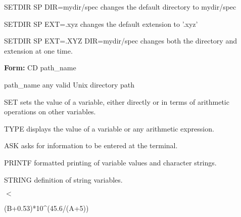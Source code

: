 {\newpage\clearpage
{}%
\begin{example}
  \item[SETDIR SP DIR=mydir/spec\hfill]{changes the default directory
       to mydir/spec}
  \item[SETDIR SP EXT=.xyz\hfill]{changes the default extension to '.xyz'}
  \item[SETDIR SP EXT=.XYZ DIR=mydir/spec\hfill]{changes both the
       directory and extension at one time.}
\end{example}%
\lthtmlfigureZ
\lthtmlcheckvsize\clearpage}

{\newpage\clearpage
{}%
\begin{command} 
  \item[\textbf{Form: } CD path\_name\hfill]{}
  \item[path\_name]{any valid Unix directory path}
\end{command}%
\lthtmlfigureZ
\lthtmlcheckvsize\clearpage}

{\newpage\clearpage
{}%
\begin{example}
  \item[SET\hfill]{sets the value of a variable, either directly or in
       terms of arithmetic operations on other variables.}
\par
\item[TYPE\hfill]{displays the value of a variable or any arithmetic
       expression.}
\par
\item[ASK\hfill]{asks for information to be entered at the terminal.}
\par
\item[PRINTF\hfill]{formatted printing of variable values and character
       strings.}
\par
\item[STRING\hfill]{definition of string variables.}
\end{example}%
\lthtmlfigureZ
\lthtmlcheckvsize\clearpage}

{\newpage\clearpage
{}%
$<$%
\lthtmlinlinemathZ
\lthtmlcheckvsize\clearpage}

{\newpage\clearpage
{}%
\begin{hanging}
  \item{(B+0.53)*10\^{ }(45.6/(A+5))}
\end{hanging}%
\lthtmlfigureZ
\lthtmlcheckvsize\clearpage}

